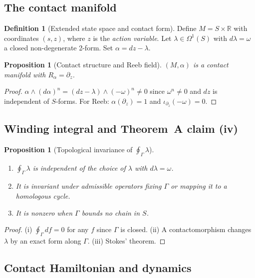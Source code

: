 \documentclass[12pt, oneside]{book}
\theoremstyle{plain}
\newtheorem{proposition}[theorem]{Proposition}
\theoremstyle{definition}
\newtheorem{definition}{Definition}[section]
\theoremstyle{remark}
\newcommand{\R}{\mathbb{R}}
\newcommand{\Orb}{\Gamma}
\begin{document}
\subsection{The contact manifold}

\begin{definition}[Extended state space and contact form]\label{def:contact-mfld}
Define $M=S\times\R$ with coordinates $(s,z)$, where $z$ is the
\emph{action variable}. Let $\lambda\in\Omega^1(S)$ with $d\lambda=\omega$
a closed non-degenerate 2-form. Set $\alpha=dz-\lambda$.
\end{definition}

\begin{proposition}[Contact structure and Reeb field]\label{prop:contact}
$(M,\alpha)$ is a contact manifold with $R_\alpha=\partial_z$.
\end{proposition}
\begin{proof}
$\alpha\wedge(d\alpha)^n=(dz-\lambda)\wedge(-\omega)^n\ne 0$ since
$\omega^n\ne 0$ and $dz$ is independent of $S$-forms. For Reeb:
$\alpha(\partial_z)=1$ and $\iota_{\partial_z}(-\omega)=0$.
\end{proof}

\subsection{Winding integral and Theorem~A claim (iv)}

\begin{proposition}[Topological invariance of $\oint_\Orb\lambda$]
\label{prop:winding}
\begin{enumerate}[label=\textup{(\roman*)}]
  \item $\oint_\Orb\lambda$ is independent of the choice of $\lambda$
        with $d\lambda=\omega$.
  \item It is invariant under admissible operators fixing $\Orb$ or
        mapping it to a homologous cycle.
  \item It is nonzero when $\Orb$ bounds no chain in $S$.
\end{enumerate}
\end{proposition}
\begin{proof}
(i) $\oint_\Orb df=0$ for any $f$ since $\Orb$ is closed.
(ii) A contactomorphism changes $\lambda$ by an exact form along $\Orb$.
(iii) Stokes' theorem.
\end{proof}

\subsection{Contact Hamiltonian and dynamics}
\end{document}
